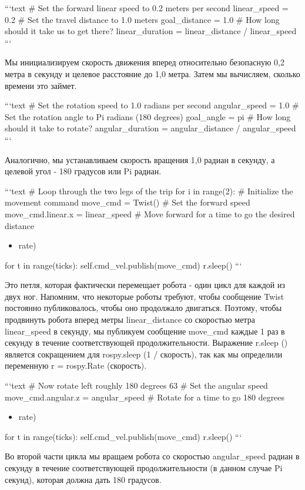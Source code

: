 ```text
# Set the forward linear speed to 0.2 meters per second
linear_speed = 0.2
# Set the travel distance to 1.0 meters
goal_distance = 1.0
# How long should it take us to get there?
linear_duration = linear_distance / linear_speed
```

Мы инициализируем скорость движения вперед относительно безопасную 0,2 метра в секунду и целевое расстояние до 1,0 метра. Затем мы вычисляем, сколько времени это займет.

```text
# Set the rotation speed to 1.0 radians per second
angular_speed = 1.0
# Set the rotation angle to Pi radians (180 degrees)
goal_angle = pi
# How long should it take to rotate?
angular_duration = angular_distance / angular_speed
```

Аналогично, мы устанавливаем скорость вращения 1,0 радиан в секунду, а целевой угол - 180 градусов или Pi радиан.

```text
# Loop through the two legs of the trip
for i in range(2):
# Initialize the movement command
move_cmd = Twist()
# Set the forward speed
move_cmd.linear.x = linear_speed
# Move forward for a time to go the desired distance
\begin{itemize} 
ticks = int(linear_duration \item { rate)} 
\end{itemize} 
for t in range(ticks):
self.cmd_vel.publish(move_cmd)
r.sleep()
```

Это петля, которая фактически перемещает робота - один цикл для каждой из двух ног. Напомним, что некоторые роботы требуют, чтобы сообщение Twist постоянно публиковалось, чтобы оно продолжало двигаться. Поэтому, чтобы продвинуть робота вперед метры linear\_distance со скоростью метра linear\_speed в секунду, мы публикуем сообщение move\_cmd каждые 1 раз в секунду в течение соответствующей продолжительности. Выражение r.sleep () является сокращением для rospy.sleep (1 / скорость), так как мы определили переменную r = rospy.Rate (скорость).

```text
# Now rotate left roughly 180 degrees 63
# Set the angular speed
move_cmd.angular.z = angular_speed
# Rotate for a time to go 180 degrees
\begin{itemize} 
ticks = int(goal_angle \item { rate)} 
\end{itemize} 
for t in range(ticks):
self.cmd_vel.publish(move_cmd)
r.sleep()
```

Во второй части цикла мы вращаем робота со скоростью angular\_speed радиан в секунду в течение соответствующей продолжительности (в данном случае Pi секунд), которая должна дать 180 градусов.

